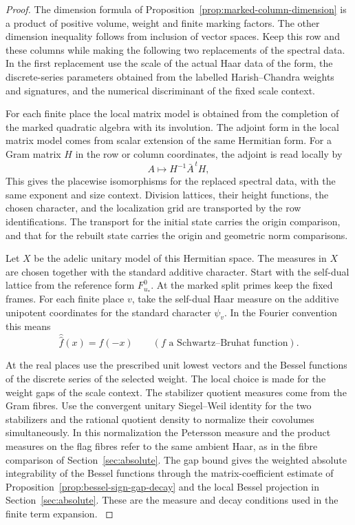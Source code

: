 \begin{proof}
The dimension formula of Proposition~\ref{prop:marked-column-dimension} is a product of positive volume, weight and finite marking factors. The other dimension inequality follows from inclusion of vector spaces. Keep this row and these columns while making the following two
replacements of the spectral data. In the first replacement use
the scale of the actual Haar data of the form, the discrete-series
parameters obtained from the labelled Harish--Chandra weights
and signatures, and the numerical discriminant of the fixed
scale context.

For each finite place the local matrix model is
obtained from the completion of the marked quadratic algebra
with its involution. The adjoint form in the local matrix model comes from scalar extension of the same Hermitian form. For a Gram matrix \(H\) in the row or column coordinates, the adjoint is read locally by
\[
 A\longmapsto H^{-1}\bar A^{\,t}H ,
\] This gives the placewise
isomorphisms for the replaced spectral data, with the same
exponent and size context. Division lattices, their height
functions, the chosen character, and the localization grid
are transported by the row identifications. The transport for
the initial state carries the origin comparison, and that for
the rebuilt state carries the origin and geometric norm
comparisons.
\label{cor:real-row-realization-1}

Let \(X\) be the adelic unitary model of this Hermitian space.
The measures in \(X\) are chosen together with the standard
additive character. Start with the self-dual lattice from
the reference form \(F_{u_*}^0\). At the marked split primes keep the fixed frames. For each finite place \(v\), take the self-dual Haar measure on the additive unipotent coordinates for the standard character \(\psi_v\). In the Fourier convention this means
\[
 \widehat{\widehat f}(x)=f(-x)\qquad(f\text{ a Schwartz--Bruhat function}).
\]

At the real places use the prescribed unit
lowest vectors and the Bessel functions of the discrete
series of the selected weight. The local choice is made
for the weight gaps of the scale context. The stabilizer
quotient measures come from the Gram fibres. Use the
convergent unitary Siegel--Weil identity for the two
stabilizers and the rational quotient density to normalize
their covolumes simultaneously. In this normalization the
Petersson measure and the product measures on the flag
fibres refer to the same ambient Haar, as in the fibre
comparison of Section~\ref{sec:absolute}. The gap bound
gives the weighted absolute integrability of the Bessel
functions through the matrix-coefficient estimate of Proposition~\ref{prop:bessel-sign-gap-decay} and the local Bessel projection in Section~\ref{sec:absolute}. These are the measure and decay
conditions used in the finite term expansion.
\label{cor:real-row-realization-2}
\end{proof}

